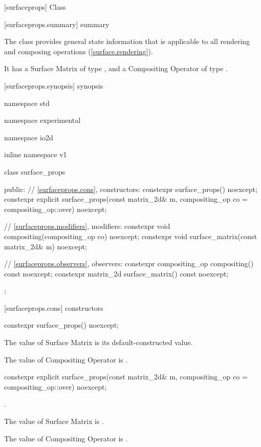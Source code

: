 
 [surfaceprops] {Class }

 [surfaceprops.summary] { summary}

\pnum
The  class provides general state information that is applicable to all rendering and composing operations (\ref{surface.rendering}).

\pnum
It has a Surface Matrix of type , and a Compositing Operator of type .

 [surfaceprops.synopsis] { synopsis}

\begin{codeblock}
namespace std { namespace experimental { namespace io2d { inline namespace v1 {
  class surface_props {
  public:
    // \ref{surfaceprops.cons}, constructors:
    constexpr surface_props() noexcept;
    constexpr explicit surface_props(const matrix_2d& m,
      compositing_op co = compositing_op::over) noexcept;
    
    // \ref{surfaceprops.modifiers}, modifiers:
    constexpr void compositing(compositing_op co) noexcept;
    constexpr void surface_matrix(const matrix_2d& m) noexcept;
    
    // \ref{surfaceprops.observers}, observers:
    constexpr compositing_op compositing() const noexcept;
    constexpr matrix_2d surface_matrix() const noexcept;
  };
}}}}
\end{codeblock}

 [surfaceprops.cons] { constructors}

\begin{itemdecl}
constexpr surface_props() noexcept;
\end{itemdecl}
\begin{itemdescr}
\pnum
\effects
The value of Surface Matrix is its default-constructed value.

\pnum
The value of Compositing Operator is .
\end{itemdescr}

\begin{itemdecl}
constexpr explicit surface_props(const matrix_2d& m,
  compositing_op co = compositing_op::over) noexcept;
\end{itemdecl}
\begin{itemdescr}
\pnum
\requires
{}.

\pnum
\effects
The value of Surface Matrix is .

\pnum
The value of Compositing Operator is .
\end{itemdescr}

